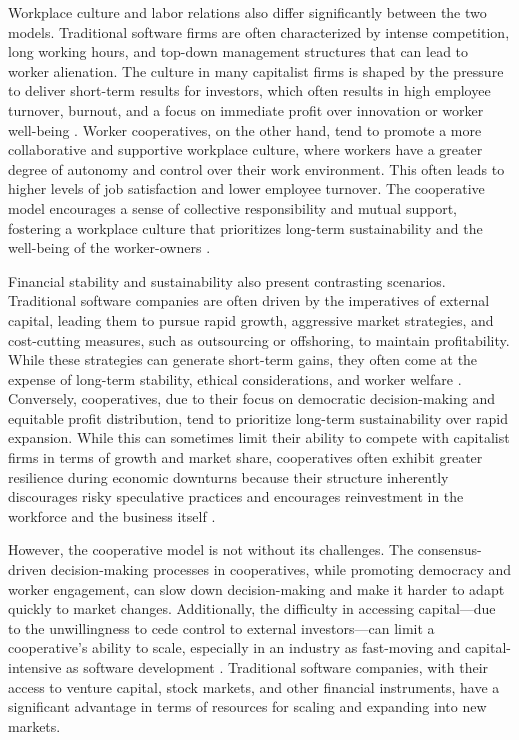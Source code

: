 \begin{refsection}
Workplace culture and labor relations also differ significantly between the two models. Traditional software firms are often characterized by intense competition, long working hours, and top-down management structures that can lead to worker alienation. The culture in many capitalist firms is shaped by the pressure to deliver short-term results for investors, which often results in high employee turnover, burnout, and a focus on immediate profit over innovation or worker well-being \cite[pp.~89-91]{mason2015}. Worker cooperatives, on the other hand, tend to promote a more collaborative and supportive workplace culture, where workers have a greater degree of autonomy and control over their work environment. This often leads to higher levels of job satisfaction and lower employee turnover. The cooperative model encourages a sense of collective responsibility and mutual support, fostering a workplace culture that prioritizes long-term sustainability and the well-being of the worker-owners \cite[pp.~201-203]{vieta2020}.

Financial stability and sustainability also present contrasting scenarios. Traditional software companies are often driven by the imperatives of external capital, leading them to pursue rapid growth, aggressive market strategies, and cost-cutting measures, such as outsourcing or offshoring, to maintain profitability. While these strategies can generate short-term gains, they often come at the expense of long-term stability, ethical considerations, and worker welfare \cite[pp.~64-66]{kelly2012}. Conversely, cooperatives, due to their focus on democratic decision-making and equitable profit distribution, tend to prioritize long-term sustainability over rapid expansion. While this can sometimes limit their ability to compete with capitalist firms in terms of growth and market share, cooperatives often exhibit greater resilience during economic downturns because their structure inherently discourages risky speculative practices and encourages reinvestment in the workforce and the business itself \cite[pp.~67-69]{scholz2016}.

However, the cooperative model is not without its challenges. The consensus-driven decision-making processes in cooperatives, while promoting democracy and worker engagement, can slow down decision-making and make it harder to adapt quickly to market changes. Additionally, the difficulty in accessing capital—due to the unwillingness to cede control to external investors—can limit a cooperative's ability to scale, especially in an industry as fast-moving and capital-intensive as software development \cite[pp.~102-104]{restakis2012}. Traditional software companies, with their access to venture capital, stock markets, and other financial instruments, have a significant advantage in terms of resources for scaling and expanding into new markets.


\end{refsection}
